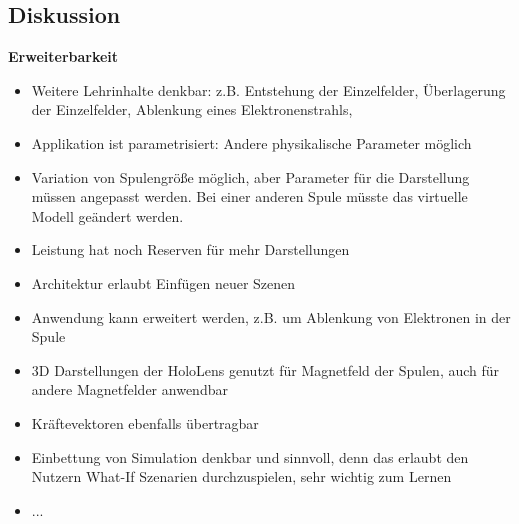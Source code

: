 \subsection{Diskussion}
\textbf{Erweiterbarkeit}
\begin{itemize}
	\item Weitere Lehrinhalte denkbar: z.B. Entstehung der Einzelfelder, Überlagerung der Einzelfelder, Ablenkung eines Elektronenstrahls, 
	\item Applikation ist parametrisiert: Andere physikalische Parameter möglich
	\item Variation von Spulengröße möglich, aber Parameter für die Darstellung müssen angepasst werden. Bei einer anderen Spule müsste das virtuelle Modell geändert werden.
	\item Leistung hat noch Reserven für mehr Darstellungen
	\item Architektur erlaubt Einfügen neuer Szenen
\end{itemize}
\begin{itemize}
	\item Anwendung kann erweitert werden, z.B. um Ablenkung von Elektronen in der Spule
	\item 3D Darstellungen der HoloLens genutzt für Magnetfeld der Spulen, auch für andere Magnetfelder anwendbar
	\item Kräftevektoren ebenfalls übertragbar
	\item Einbettung von Simulation denkbar und sinnvoll, denn das erlaubt den Nutzern What-If Szenarien durchzuspielen, sehr wichtig zum Lernen
	\item ...
\end{itemize}
	
	
	
	
	
	
	
	
	
	
	
	
	
	
	
